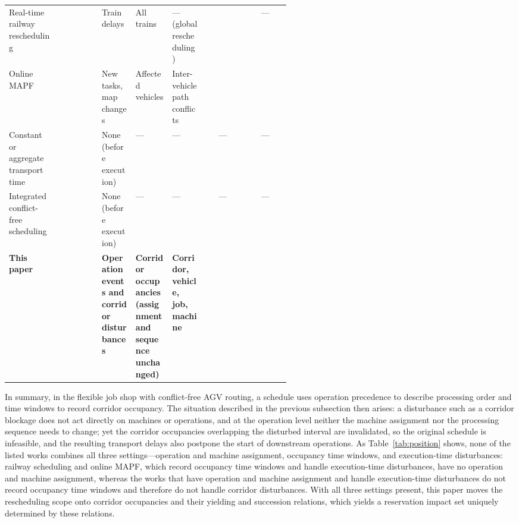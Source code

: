 \documentclass[manuscript,screen,review]{acmart}
\newcommand{\cmark}{\ding{51}}
\newcommand{\xmark}{\ding{55}}
\begin{document}
\begin{table}[t]
\begin{tabular}{@{}>{\raggedright\arraybackslash}p{0.18\linewidth}cc>{\raggedright\arraybackslash}p{0.12\linewidth}>{\raggedright\arraybackslash}p{0.13\linewidth}>{\raggedright\arraybackslash}p{0.12\linewidth}cc@{}}
Real-time railway rescheduling~\cite{mascis2002alternative,dariano2007branch} &
\xmark & \cmark & Train delays & All trains & --- (global rescheduling) & \cmark & --- \\
Online MAPF~\cite{svancara2019online,malka2024online} &
\xmark & \cmark & New tasks, map changes & Affected vehicles & Inter-vehicle path conflicts & \cmark & \xmark \\
Constant or aggregate transport time~\cite{meng2025cp,qin2026knowledge,jafarian2026integrated} &
\cmark & \xmark & None (before execution) & --- & --- & --- & --- \\
Integrated conflict-free scheduling~\cite{vanos2026exact,sun2023integrated,li2026framework} &
\cmark & \cmark & None (before execution) & --- & --- & --- & --- \\
\midrule
\textbf{This paper} &
\cmark & \cmark & \textbf{Operation events and corridor disturbances} & \textbf{Corridor occupancies (assignment and sequence unchanged)} & \textbf{Corridor, vehicle, job, machine} & \cmark & \cmark \\
\bottomrule
\end{tabular}
\end{table}

In summary, in the flexible job shop with conflict-free AGV routing, a schedule uses operation precedence to describe processing order
and time windows to record corridor occupancy. The situation described in the previous subsection then arises:
a disturbance such as a corridor blockage does not act directly on machines or operations, and at the operation level neither the machine assignment nor the processing sequence needs to change;
yet the corridor occupancies overlapping the disturbed interval are invalidated, so the original schedule is infeasible, and the resulting transport delays also postpone the start of downstream operations.
As Table~\ref{tab:position} shows, none of the listed works combines all three settings---operation and machine assignment, occupancy time windows, and execution-time disturbances:
railway scheduling and online MAPF, which record occupancy time windows and handle execution-time disturbances, have no operation and machine assignment,
whereas the works that have operation and machine assignment and handle execution-time disturbances do not record occupancy time windows and therefore do not handle corridor disturbances.
With all three settings present, this paper moves the rescheduling scope onto corridor occupancies and their yielding and succession relations, which yields a reservation impact set uniquely determined by these relations.
\end{document}
